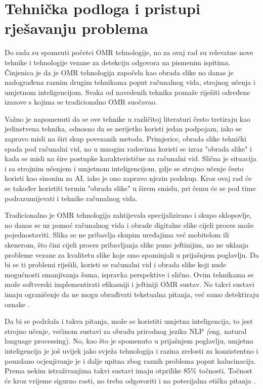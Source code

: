 \documentclass{foi}
\begin{document}
\section{Tehnička podloga i pristupi rješavanju problema}

Do sada su spomeuti početci OMR tehnologije, no za ovaj rad su relevatne nove tehnike i tehnologije vezane za detekciju odgovora na pismenim ispitima. Činjenica je da je OMR tehnologija započela kao obrada slike no danas je nadograđena raznim drugim tehnikama poput računalnog vida, strojnog učenja i umjetnom inteligencijom. Svaka od navedenih tehnika pomaže riješiti određene izazove s kojima se tradicionalno OMR suočavao.

Važno je napomenuti da se ove tehnike u različitoj literaturi često tretiraju kao jedinstvena tehnika, odnosno da se nerijetko koristi jedan podpojam, iako se zapravo misli na širi skup povezanih metoda. Primjerice, obrada slike tehnički spada pod računalni vid, no u mnogim radovima koristi se izraz "obrada slike" i kada se misli na šire postupke karakteristične za računalni vid. Slična je situacija i sa strojnim učenjem i umjetnom inteligencijom, gdje se strojno učenje često koristi kao sinonim za AI, iako je ono zapravo njezin podskup. Kroz ovaj rad će se također koristiti termin "obrada slike" u širem smislu, pri čemu će se pod time podrazumijevati i tehnike računalnog vida.

Tradicionalno je OMR tehnologija zahtijevala specijalizirano i skupo sklopovlje, no danas se uz pomoć računalnog vida i obrade digitalne slike cijeli proces može pojednostaviti. Slika se ne pribavlja skupim uređajima već mobitelom ili skenerom, što čini cijeli proces pribavljanja slike puno jeftinijim, no ne uklanja probleme vezane za kvalitetu slike koje smo spominjali u prijašnjem poglavlju. Da bi se ti problemi riješili, koristi se računalni vid i obrada slike koji nude mogućnosti smanjivanja šuma, ispravka perspektive i slično. Ovim tehnikama se može softverski implementirati efikasniji i jeftiniji OMR sustav. No takvi sustavi imaju ograničenje da ne mogu obrađivati tekstualna pitanja, već samo detektiraju oznake \cite{OMRImageProcessing}.

Da bi se podržala i takva pitanja, može se koristiti umjetna inteligencija, to jest strojno učenje, većinom sustavi za obradu prirodnog jezika NLP \textit({eng. natural language processing}). No, kao što je spomenuto u prijašnjem poglavlju, umjetna inteligencija je još uvijek jako svježa tehnologija i razina zrelosti za konzistentno i pouzdano ocjenjivanje je i dalje upitna zbog raznih problema poput halucinacija. Prema nekim istraživanjima takvi sustavi imaju otprilike 85\% točnosti. Točnost će kroz vrijeme sigurno rasti, no treba odgovoriti i na potecijalna etička pitanja \cite{OMRNLP}.
\end{document}
